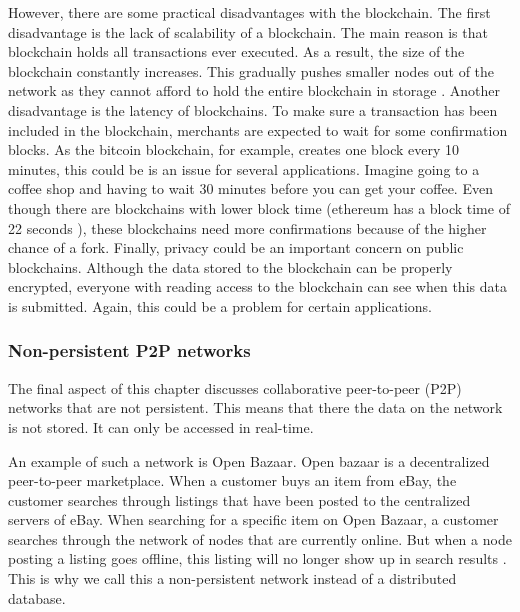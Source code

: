 However, there are some practical disadvantages with the blockchain. The first disadvantage is the lack of scalability of a blockchain. The main reason is that blockchain holds all transactions ever executed. As a result, the size of the blockchain constantly increases. This gradually pushes smaller nodes out of the network as they cannot afford to hold the entire blockchain in storage \cite{blockchain-scalability}. Another disadvantage is the latency of blockchains. To make sure a transaction has been included in the blockchain, merchants are expected to wait for some confirmation blocks. As the bitcoin blockchain, for example, creates one block every 10 minutes, this could be is an issue for several applications. Imagine going to a coffee shop and having to wait 30 minutes before you can get your coffee. Even though there are blockchains with lower block time (ethereum has a block time of 22 seconds \cite{ethereum-block-time}), these blockchains need more confirmations because of the higher chance of a fork. Finally, privacy could be an important concern on public blockchains. Although the data stored to the blockchain can be properly encrypted, everyone with reading access to the blockchain can see when this data is submitted. Again, this could be a problem for certain applications.

\subsubsection{Non-persistent P2P networks}

The final aspect of this chapter discusses collaborative peer-to-peer (P2P) networks that are not persistent. This means that there the data on the network is not stored. It can only be accessed in real-time. 

An example of such a network is Open Bazaar. Open bazaar is a decentralized peer-to-peer marketplace. When a customer buys an item from eBay, the customer searches through listings that have been posted to the centralized servers of eBay. When searching for a specific item on Open Bazaar, a customer searches through the network of nodes that are currently online. But when a node posting a listing goes offline, this listing will no longer show up in search results \cite{openbazaar-faq}. This is why we call this a non-persistent network instead of a distributed database.

